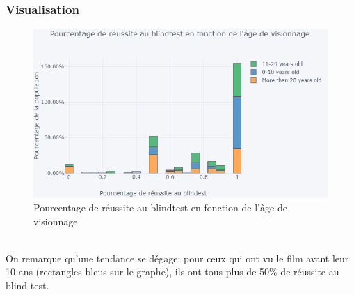 \documentclass{article} %
\begin{document}
\subsubsection{Visualisation}

\begin{figure}[!h]
	\includegraphics[keepaspectratio,scale=0.6]{h8.png}
	\caption{Pourcentage de réussite au blindtest en fonction de l'âge de visionnage}
\end{figure}~\\
On remarque qu’une tendance se dégage: pour ceux qui ont vu le film avant leur 10 ans (rectangles bleus sur le graphe), ils ont tous plus de 50\% de réussite au blind test. 
\end{document}
